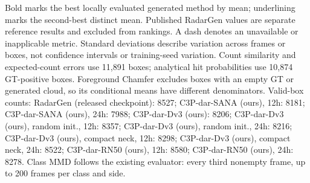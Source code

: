 \begin{table}[t]
{\begin{tabular}{lrrrrrrrrr}
\end{tabular}%
}
\medskip
\smallskip
\begin{minipage}{\textwidth}
\footnotesize
Bold marks the best locally evaluated generated method by mean; underlining marks the second-best distinct mean. Published RadarGen values are separate reference results and excluded from rankings. A dash denotes an unavailable or inapplicable metric. Standard deviations describe variation across frames or boxes, not confidence intervals or training-seed variation. Count similarity and expected-count errors use 11,891 boxes; analytical hit probabilities use 10,874 GT-positive boxes. Foreground Chamfer excludes boxes with an empty GT or generated cloud, so its conditional means have different denominators. Valid-box counts: RadarGen (released checkpoint): 8527; C3P-dar-SANA (ours), 12h: 8181; C3P-dar-SANA (ours), 24h: 7988; C3P-dar-Dv3 (ours): 8206; C3P-dar-Dv3 (ours), random init., 12h: 8357; C3P-dar-Dv3 (ours), random init., 24h: 8216; C3P-dar-Dv3 (ours), compact neck, 12h: 8298; C3P-dar-Dv3 (ours), compact neck, 24h: 8522; C3P-dar-RN50 (ours), 12h: 8580; C3P-dar-RN50 (ours), 24h: 8278. Class MMD follows the existing evaluator: every third nonempty frame, up to 200 frames per class and side.
\end{minipage}
\end{table}

